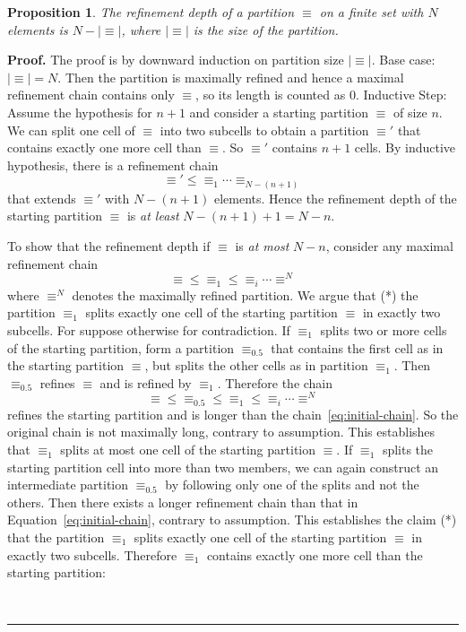 \documentclass{elsarticle}%
\newtheorem{proposition}[theorem]{Proposition}
\renewenvironment{proof}[1][Proof]{\noindent\textbf{#1.} }{\ \rule{0.5em}{0.5em}}
\newcommand{\isincluded}{\leq}
\newcommand{\partition}{\equiv}
\begin{document}
\setcounter{theorem}{6}

\begin{proposition}
The refinement depth of a partition $\partition$ on a finite set with $N$ elements is $N-|\partition|$, where $|\partition|$ is the size of the partition.  
\end{proposition}


\begin{proof}
The proof is by downward induction on partition size $|\partition|$. Base case: $|\partition|=N$. Then the partition is maximally refined and hence a maximal refinement chain contains only $\partition$, so its length is counted as 0. 
Inductive Step: Assume the hypothesis for $n+1$ and consider a starting partition $\partition$ of size $n$. We can split one cell of  $\partition$ into two subcells to obtain a partition $\partition'$ that contains exactly one more cell than $\partition$. So $\partition'$ contains $n+1$ cells. By inductive hypothesis, there is a refinement chain
$$\partition' \isincluded \partition_{1} \cdots \partition_{N-(n+1)}$$ that extends $\partition'$ with $N-(n+1)$ elements. Hence the refinement depth of the starting partition $\partition$ is {\em at least} $N-(n+1)+1 = N-n$. 

To show that the refinement depth if $\partition$ is {\em at most} $N-n$, consider any maximal refinement chain
\begin{equation}
\partition \isincluded \partition_{1} \isincluded \partition_{i} \cdots \partition^{N}\label{eq:initial-chain}
\end{equation} where $\partition^{N}$ denotes the maximally refined partition. 
We argue that (*) the partition  $\partition_{1}$ splits exactly one cell of the starting partition $\partition$ in exactly two subcells. For suppose otherwise for contradiction. If $\partition_{1}$ splits two or more cells of the starting partition, form a partition $\partition_{0.5}$ that contains the first cell as in the starting partition $\partition$, but splits the other cells as in partition $\equiv_{1}$. Then $\equiv_{0.5}$ refines $\equiv$ and is refined by $\equiv_{1}$. Therefore the chain 
$$\partition \isincluded \partition_{0.5} \isincluded \partition_{1} \isincluded \partition_{i} \cdots \partition^{N}$$
refines the starting partition and is longer than the chain~\eqref{eq:initial-chain}.  So the original chain is not maximally long, contrary to assumption. This establishes that $\partition_{1}$ splits at most one cell of the starting partition $\partition$. If $\partition_{1}$ splits the starting partition cell into more than two members, we can again construct an intermediate partition $\equiv_{0.5}$ by following only one of the splits and not the others. Then there exists a longer refinement chain than that in Equation~\eqref{eq:initial-chain}, contrary to assumption. This establishes the claim (*) that the partition  $\partition_{1}$ splits exactly one cell of the starting partition $\partition$ in exactly two subcells. Therefore $\partition_{1}$ contains exactly one more cell than the starting partition:


\end{proof}
\end{document}
